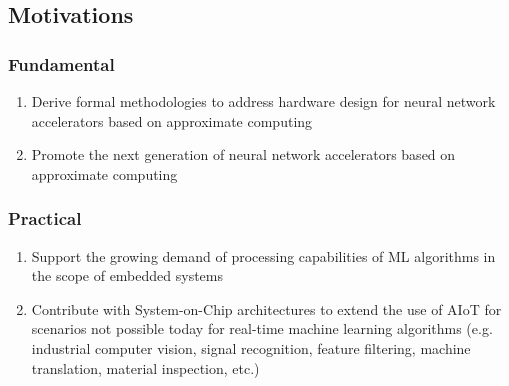 \subsection{Motivations}

\subsubsection{Fundamental}
\begin{enumerate}
	\item Derive formal methodologies to address hardware design for neural network accelerators based on approximate computing
	\item Promote the next generation of neural network accelerators based on approximate computing
\end{enumerate}

\subsubsection{Practical}
\begin{enumerate}
	\item Support the growing demand of processing capabilities of ML algorithms in the scope of embedded systems
	\item Contribute with System-on-Chip architectures to extend the use of AIoT for scenarios not possible today for real-time machine learning algorithms (e.g. industrial computer vision, signal recognition, feature filtering, machine translation, material inspection, etc.)
\end{enumerate}








